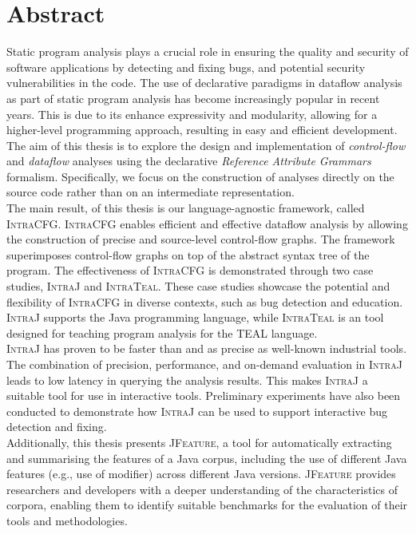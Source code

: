 \chapter{Abstract}


Static program analysis plays a crucial role in ensuring the quality and security of
software applications by detecting and fixing bugs,
and potential security vulnerabilities in the code. The use of declarative
paradigms in dataflow analysis as part of static program analysis has become 
increasingly popular in recent years. This is due to its enhance expressivity 
and modularity, allowing for a higher-level programming approach, resulting in
easy and efficient development.\\[5pt]

The aim of this thesis is to explore the design and implementation of \emph{control-flow} and 
\emph{dataflow} analyses using the declarative \emph{Reference Attribute Grammars} formalism.
Specifically, we focus on the construction of analyses directly on the source code 
rather than on an intermediate representation.\\[5pt]

The main result, of this thesis is our language-agnostic framework, called \textsc{IntraCFG}.
\textsc{IntraCFG} enables efficient and effective dataflow analysis by allowing the construction of precise and
source-level control-flow graphs. The framework superimposes control-flow
graphs on top of the abstract syntax tree of the program. 
The effectiveness of \textsc{IntraCFG} is demonstrated through two case studies, 
\textsc{IntraJ} and \textsc{IntraTeal}. These case studies showcase the potential and 
flexibility of \textsc{IntraCFG} in diverse contexts, such as bug detection and education. 
\textsc{IntraJ} supports the Java programming language, while 
\textsc{IntraTeal} is an tool designed for teaching program analysis for the TEAL language.\\[5pt]

\textsc{IntraJ} has proven to be faster than and as precise as well-known
industrial tools. 
The combination of precision, performance, and on-demand evaluation in \textsc{IntraJ} 
leads to low latency in querying the analysis results. This makes \textsc{IntraJ} a
suitable tool for use in interactive tools. Preliminary experiments have also 
been conducted to demonstrate how \textsc{IntraJ} can be used to support interactive
bug detection and fixing.\\[5pt]

Additionally, this thesis presents \textsc{JFeature}, a tool for automatically extracting
and summarising the features of a Java corpus, including the use of different Java features (e.g., use of  modifier) across different
Java versions. \textsc{JFeature} provides 
researchers and developers with a deeper understanding of the characteristics of 
corpora, enabling them to identify suitable benchmarks for the evaluation of their 
tools and methodologies.
